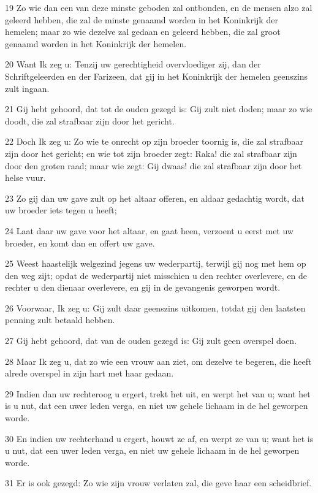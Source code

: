 \par 19 Zo wie dan een van deze minste geboden zal ontbonden, en de mensen alzo zal geleerd hebben, die zal de minste genaamd worden in het Koninkrijk der hemelen; maar zo wie dezelve zal gedaan en geleerd hebben, die zal groot genaamd worden in het Koninkrijk der hemelen.
\par 20 Want Ik zeg u: Tenzij uw gerechtigheid overvloediger zij, dan der Schriftgeleerden en der Farizeen, dat gij in het Koninkrijk der hemelen geenszins zult ingaan.
\par 21 Gij hebt gehoord, dat tot de ouden gezegd is: Gij zult niet doden; maar zo wie doodt, die zal strafbaar zijn door het gericht.
\par 22 Doch Ik zeg u: Zo wie te onrecht op zijn broeder toornig is, die zal strafbaar zijn door het gericht; en wie tot zijn broeder zegt: Raka! die zal strafbaar zijn door den groten raad; maar wie zegt: Gij dwaas! die zal strafbaar zijn door het helse vuur.
\par 23 Zo gij dan uw gave zult op het altaar offeren, en aldaar gedachtig wordt, dat uw broeder iets tegen u heeft;
\par 24 Laat daar uw gave voor het altaar, en gaat heen, verzoent u eerst met uw broeder, en komt dan en offert uw gave.
\par 25 Weest haastelijk welgezind jegens uw wederpartij, terwijl gij nog met hem op den weg zijt; opdat de wederpartij niet misschien u den rechter overlevere, en de rechter u den dienaar overlevere, en gij in de gevangenis geworpen wordt.
\par 26 Voorwaar, Ik zeg u: Gij zult daar geenszins uitkomen, totdat gij den laatsten penning zult betaald hebben.
\par 27 Gij hebt gehoord, dat van de ouden gezegd is: Gij zult geen overspel doen.
\par 28 Maar Ik zeg u, dat zo wie een vrouw aan ziet, om dezelve te begeren, die heeft alrede overspel in zijn hart met haar gedaan.
\par 29 Indien dan uw rechteroog u ergert, trekt het uit, en werpt het van u; want het is u nut, dat een uwer leden verga, en niet uw gehele lichaam in de hel geworpen worde.
\par 30 En indien uw rechterhand u ergert, houwt ze af, en werpt ze van u; want het is u nut, dat een uwer leden verga, en niet uw gehele lichaam in de hel geworpen worde.
\par 31 Er is ook gezegd: Zo wie zijn vrouw verlaten zal, die geve haar een scheidbrief.
